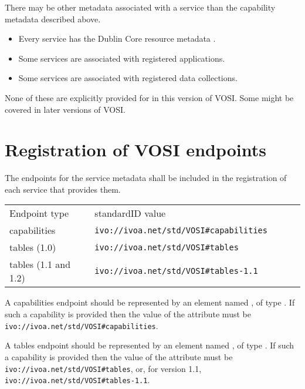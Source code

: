 \documentclass[11pt,letter]{ivoa}
\begin{document}
There may be other metadata associated with a service than the
capability metadata described above.

\begin{itemize}
\item Every service has the Dublin Core resource metadata \citep{std:DUBLINCORE}.
\item Some services are associated with registered applications.
\item Some services are associated with registered data collections. 
\end{itemize}

None of these are explicitly provided for in this version of VOSI. Some
might be covered in later versions of VOSI. 

\section{Registration of VOSI endpoints}
\label{sec:endpoints}

The endpoints for the service metadata shall be
included in the registration of each service that provides them.

\begin{tabular}{l l l l l}
\label{tab:registration}
Endpoint type & standardID value \\
capabilities & \nolinkurl{ivo://ivoa.net/std/VOSI#capabilities} \\
tables (1.0) & \nolinkurl{ivo://ivoa.net/std/VOSI#tables} \\
tables (1.1 and 1.2) & \nolinkurl{ivo://ivoa.net/std/VOSI#tables-1.1} \\
\end{tabular}

A capabilities endpoint should be represented by an element named
, of type
. If such a
capability is provided then the value of the 
attribute must be \nolinkurl{ivo://ivoa.net/std/VOSI#capabilities}.

A tables endpoint should be represented by an element named
, of type
. If such a
capability is provided then the value of the 
attribute must be \nolinkurl{ivo://ivoa.net/std/VOSI\#tables}, or, for
version 1.1, \nolinkurl{ivo://ivoa.net/std/VOSI\#tables-1.1}.
\end{document}
